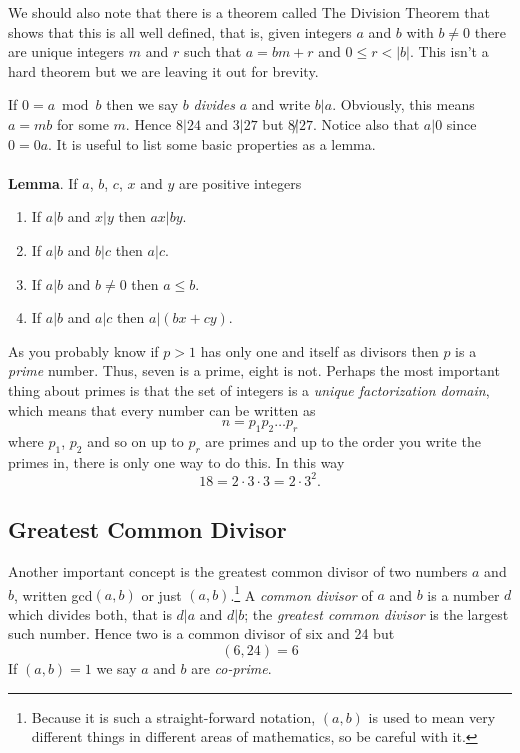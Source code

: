 \documentclass[12pt]{article}
\begin{document}
We should also note that there is a theorem called The Division
Theorem that shows that this is all well defined, that is, given
integers $a$ and $b$ with $b\not=0$ there are unique integers $m$ and
$r$ such that $a=bm+r$ and $0\le r<|b|$. This isn't a hard theorem but
we are leaving it out for brevity.

If $0=a\bmod b$ then we say $b$ \emph{divides} $a$ and write
$b|a$. Obviously, this means $a=mb$ for some $m$. Hence $8|24$ and
$3|27$ but $8\not|27$. Notice also that $a|0$ since $0=0a$. \HandRight It is useful to list some basic properties as a lemma.\\
\\
\noindent \textbf{Lemma}. If $a$, $b$, $c$, $x$ and $y$ are positive integers
\begin{enumerate}
\item If $a|b$ and $x|y$ then $ax|by$.
\item If $a|b$ and $b|c$ then $a|c$.
\item If $a|b$ and $b\not=0$ then $a\le b$.
\item If $a|b$ and $a|c$ then $a|(bx+cy)$.
\end{enumerate}

As you probably know if $p>1$ has only one and itself as divisors then
$p$ is a \emph{prime} number. Thus, seven is a prime, eight is not. Perhaps
the most important thing about primes is that the set of integers is a \emph{unique factorization domain}, which means that every number can be written as
\begin{equation}
n=p_1p_2\ldots p_r
\end{equation}
where $p_1$, $p_2$ and so on up to $p_r$ are primes and up to the
order you write the primes in, there is only one way to do this. In this way
\begin{equation}
18=2\cdot 3 \cdot 3 =2 \cdot 3^2.
\end{equation}

\subsection*{Greatest Common Divisor}

Another important concept is the greatest common divisor of two
numbers $a$ and $b$, written gcd$(a,b)$ or just
$(a,b)$.\footnote{Because it is such a straight-forward notation,
  $(a,b)$ is used to mean very different things in different areas of
  mathematics, so be careful with it.} A \emph{common divisor} of $a$
and $b$ is a number $d$ which divides both, that is $d|a$ and $d|b$;
the \emph{greatest common divisor} is the largest such number. Hence
two is a common divisor of six and 24 but
\begin{equation}
(6,24)=6
\end{equation}
If $(a,b)=1$ we say $a$ and $b$ are \emph{co-prime}. 
\end{document}
